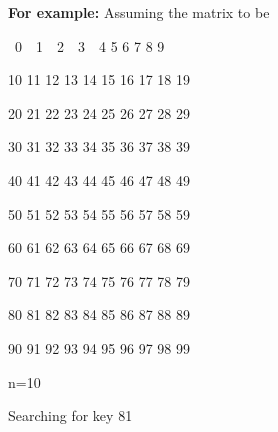 \documentclass[14pt]{article}
\renewcommand{\_}{\kern-1.5pt\textunderscore\kern-1.5pt}
\begin{document}
\begin{multicols}{2}
\begin{enumerate}
\vspace{\baselineskip}
\begin{justify}
\textbf{For example: }Assuming the matrix to be
\end{justify}
\begin{justify}
\ 0\ \ 1\ \ 2\ \ 3\ \ 4  5  6  7  8  9
\end{justify}
\begin{justify}
10 11 12 13 14 15 16 17 18 19 
\end{justify}
\begin{justify}
20 21 22 23 24 25 26 27 28 29 
\end{justify}
\begin{justify}
30 31 32 33 34 35 36 37 38 39 
\end{justify}
\begin{justify}
40 41 42 43 44 45 46 47 48 49 
\end{justify}
\begin{justify}
50 51 52 53 54 55 56 57 58 59 
\end{justify}
\begin{justify}
60 61 62 63 64 65 66 67 68 69 
\end{justify}
\begin{justify}
70 71 72 73 74 75 76 77 78 79 
\end{justify}
\begin{justify}
80 81 82 83 84 85 86 87 88 89 
\end{justify}
\begin{justify}
90 91 92 93 94 95 96 97 98 99 
\end{justify}
\begin{justify}
n=10
\end{justify}
\begin{justify}
Searching for key 81
\end{justify}


\end{enumerate}
\end{multicols}
\end{document}
